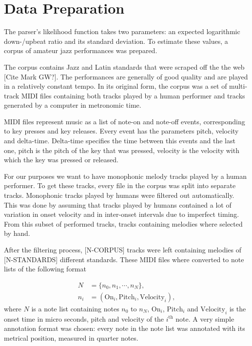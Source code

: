 

\section{Data Preparation}

The parser's likelihood function takes two parameters: an expected logarithmic down-/upbeat ratio and its standard deviation. To estimate these values, a corpus of amateur jazz performances was prepared.

The corpus contains Jazz and Latin standards that were scraped off the the web [Cite Mark GW?]. The performances are generally of good quality and are played in a relatively constant tempo. In its original form, the corpus was a set of multi-track MIDI files containing both tracks played by a human performer and tracks generated by a computer in metronomic time.

MIDI files represent music as a list of note-on and note-off events, corresponding to key presses and key releases. Every event has the parameters pitch, velocity and delta-time. Delta-time specifies the time between this events and the last one, pitch is the pitch of the key that was pressed, velocity is the velocity with which the key was pressed or released.

For our purposes we want to have monophonic melody tracks played by a human performer. To get these tracks, every file in the corpus was split into separate tracks. Monophonic tracks played by humans were filtered out automatically. This was done by assuming that tracks played by humans contained a lot of variation in onset velocity and in inter-onset intervals due to imperfect timing. From this subset of performed tracks, tracks containing melodies where selected by hand. 

After the filtering process, [N-CORPUS] tracks were left containing melodies of [N-STANDARDS] different standards. These MIDI files where converted to note lists of the following format

\begin{align*}
N &= \{n_0, n_1, \cdots, n_N\},\\
n_i &= (\mathrm{On}_i, \mathrm{Pitch}_i, \mathrm{Velocity}_i),
\end{align*}
where $N$ is a note list containing notes $n_0$ to $n_N$, $\mathrm{On}_i$, $\mathrm{Pitch}_i$ and $\mathrm{Velocity}_i$ is the onset time in micro seconds, pitch and velocity of the $i^{\mathrm{th}}$ note. A very simple annotation format was chosen: every note in the note list was annotated with its metrical position, measured in quarter notes. 

